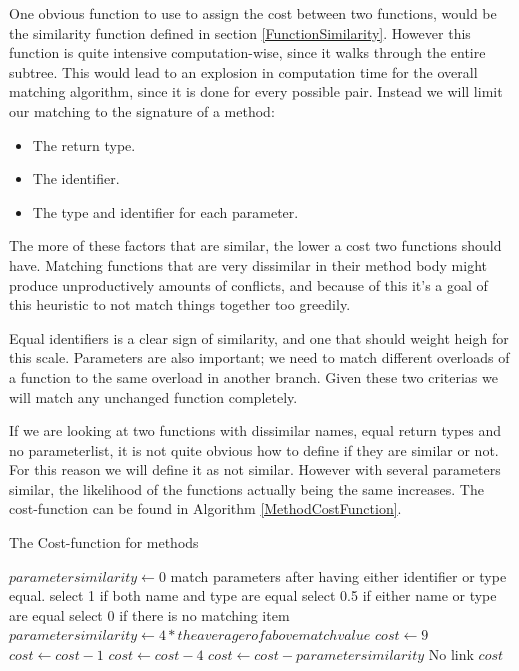 \documentclass[11pt]{article}
\begin{document}
One obvious function to use to assign the cost between two functions, would be the similarity function defined in section \ref{FunctionSimilarity}. However this function is quite intensive computation-wise, since it walks through the entire subtree. This would lead to an explosion in computation time for the overall matching algorithm, since it is done for every possible pair. Instead we will limit our matching to the signature of a method:

\begin{itemize}
    \item The return type.
    \item The identifier.
    \item The type and identifier for each parameter.
\end{itemize}

The more of these factors that are similar, the lower a cost two functions should have. Matching functions that are very dissimilar in their method body might produce unproductively amounts of conflicts, and because of this it's a goal of this heuristic to not match things together too greedily.

Equal identifiers is a clear sign of similarity, and one that should weight heigh for this scale. Parameters are also important; we need to match different overloads of a function to the same overload in another branch. Given these two criterias we will match any unchanged function completely.

If we are looking at two functions with dissimilar names, equal return types and no parameterlist, it is not quite obvious how to define if they are similar or not. For this reason we will define it as not similar. However with several parameters similar, the likelihood of the functions actually being the same increases.  The cost-function can be found in Algorithm \ref{MethodCostFunction}.
\begin{algorithm}
\caption{The Cost-function for methods}
\label{MethodCostFunction}
\begin{algorithmic}
   \State $parametersimilarity \gets 0$
      \State match parameters after having either identifier or type equal.
	      \State select 1 if both name and type are equal
    	  \State select 0.5 if either name or type are equal
	      \State select 0 if there is no matching item
      \EndFor
      \State $parametersimilarity \gets 4*the averager of above match value$
   \EndIf
   \State $cost \gets 9$
      \State $cost \gets cost - 1$
   \EndIf
      \State $cost \gets cost - 4$
   \EndIf
   \State $cost \gets cost - parametersimilarity$
         \State \Return No link
   \EndIf
   \State \Return $cost$
\EndFunction
\end{algorithmic}
\end{algorithm}
\end{document}
